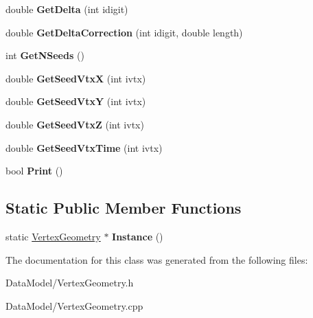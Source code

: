 \begin{DoxyCompactItemize}
\item 
\hypertarget{classVertexGeometry_ad4284adc79b1135771c00181ee45e943}{
double {\bfseries GetDelta} (int idigit)}
\label{classVertexGeometry_ad4284adc79b1135771c00181ee45e943}

\item 
\hypertarget{classVertexGeometry_a9879da406fa81cc2216c586c57f6aff9}{
double {\bfseries GetDeltaCorrection} (int idigit, double length)}
\label{classVertexGeometry_a9879da406fa81cc2216c586c57f6aff9}

\item 
\hypertarget{classVertexGeometry_a3ae6ead6c902cd6afa16eff62d2e7fbc}{
int {\bfseries GetNSeeds} ()}
\label{classVertexGeometry_a3ae6ead6c902cd6afa16eff62d2e7fbc}

\item 
\hypertarget{classVertexGeometry_a61e40675ff74d059d33f7caecd9c5119}{
double {\bfseries GetSeedVtxX} (int ivtx)}
\label{classVertexGeometry_a61e40675ff74d059d33f7caecd9c5119}

\item 
\hypertarget{classVertexGeometry_a4cb1136b60514d74afce0baed5a59a5e}{
double {\bfseries GetSeedVtxY} (int ivtx)}
\label{classVertexGeometry_a4cb1136b60514d74afce0baed5a59a5e}

\item 
\hypertarget{classVertexGeometry_adc04b17f41f7bf2d1019bf2a4047e18f}{
double {\bfseries GetSeedVtxZ} (int ivtx)}
\label{classVertexGeometry_adc04b17f41f7bf2d1019bf2a4047e18f}

\item 
\hypertarget{classVertexGeometry_a297e42e770f0e8222b567ec279d5b910}{
double {\bfseries GetSeedVtxTime} (int ivtx)}
\label{classVertexGeometry_a297e42e770f0e8222b567ec279d5b910}

\item 
\hypertarget{classVertexGeometry_abbbb887e514513a93a82c183918ea140}{
bool {\bfseries Print} ()}
\label{classVertexGeometry_abbbb887e514513a93a82c183918ea140}

\end{DoxyCompactItemize}
\subsection*{Static Public Member Functions}
\begin{DoxyCompactItemize}
\item 
\hypertarget{classVertexGeometry_aabc5f26abc1c7f40688a03c01d6ec22d}{
static \hyperlink{classVertexGeometry}{VertexGeometry} $\ast$ {\bfseries Instance} ()}
\label{classVertexGeometry_aabc5f26abc1c7f40688a03c01d6ec22d}

\end{DoxyCompactItemize}


The documentation for this class was generated from the following files:\begin{DoxyCompactItemize}
\item 
DataModel/VertexGeometry.h\item 
DataModel/VertexGeometry.cpp\end{DoxyCompactItemize}

